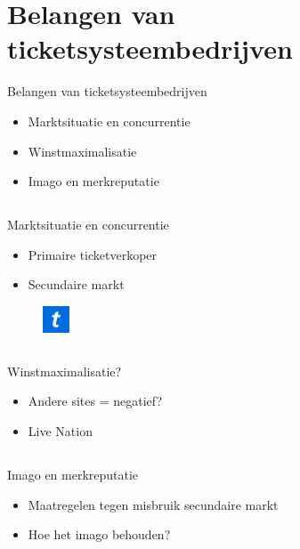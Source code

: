 \documentclass{beamer}
\begin{document}
\section[Bedrijf]{Belangen van ticketsysteembedrijven}
\begin{frame}{Belangen van ticketsysteembedrijven}
    \begin{itemize}
        \item Marktsituatie en concurrentie
        \item Winstmaximalisatie
        \item Imago en merkreputatie
    \end{itemize}
\end{frame}

    \subsection{}
    \begin{frame}{Marktsituatie en concurrentie}
        \begin{itemize}
            \item Primaire ticketverkoper
            \item Secundaire markt
        \end{itemize}
        \begin{figure}
            \includegraphics[width=30px,height=30px,keepaspectratio]{Ticketmaster_logo}            
        \end{figure}
    \end{frame}
    
    \subsection{}
    \begin{frame}{Winstmaximalisatie?}
        \begin{itemize}
            \item Andere sites = negatief?
            \item Live Nation
        \end{itemize}
    \end{frame}

    \subsection{}
    \begin{frame}{Imago en merkreputatie}
        \begin{itemize}
            \item Maatregelen tegen misbruik secundaire markt
            \item Hoe het imago behouden?
        \end{itemize}
    \end{frame}
\end{document}
